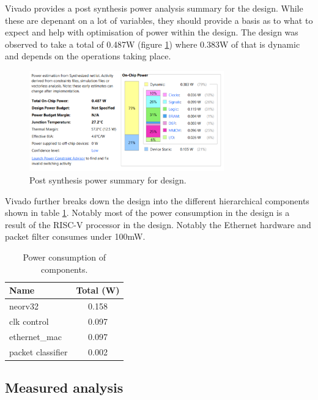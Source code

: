 Vivado provides a post synthesis power analysis summary for the design. While these are depenant on a lot of variables, they should provide a basis as to what to expect and help with optimisation of power within the design. The design was observed to take a total of 0.487W (figure \ref{fig:post_synth_power_summary}) where 0.383W of that is dynamic and depends on the operations taking place. 

\begin{figure}[h]
    \centering
    \includegraphics[width=0.75\textwidth]{Images/power_summary.png}
    \caption[Post synthesis power summary for design]{Post synthesis power summary for design.}
    \label{fig:post_synth_power_summary}
\end{figure}


Vivado further breaks down the design into the different hierarchical components shown in table \ref{tab:power_consumption}. Notably most of the power consumption in the design is a result of the RISC-V processor in the design. Notably the Ethernet hardware and packet filter consumes under 100mW. 

\begin{table}
    \centering
    \caption{Power consumption of components.}
    \begin{tabular}{lc}
        \toprule
        Name & Total (W) \\
        \midrule
        neorv32 & 0.158 \\
        clk control & 0.097 \\
        ethernet\_mac & 0.097 \\
        packet classifier & 0.002 \\
        \bottomrule
    \end{tabular}
    \label{tab:power_consumption}
\end{table}






\subsection{Measured analysis}

